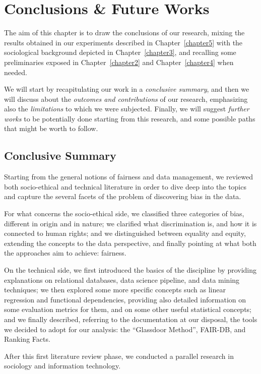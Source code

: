 \chapter{Conclusions \& Future Works}
\label{chapter6}
\thispagestyle{empty}

The aim of this chapter is to draw the conclusions of our research, mixing the results obtained in our experiments described in Chapter~\ref{chapter5} with the sociological background depicted in Chapter~\ref{chapter3}, and recalling some preliminaries exposed in Chapter~\ref{chapter2} and Chapter~\ref{chapter4} when needed.

We will start by recapitulating our work in a \textit{conclusive summary}, and then we will discuss about the \textit{outcomes and contributions} of our research, emphasizing also the \textit{limitations} to which we were subjected. Finally, we will suggest \textit{further works} to be potentially done starting from this research, and some possible paths that might be worth to follow.


\section{Conclusive Summary}
Starting from the general notions of fairness and data management, we reviewed both socio-ethical and technical literature in order to dive deep into the topics and capture the several facets of the problem of discovering bias in the data.

For what concerns the socio-ethical side, we classified three categories of bias, different in origin and in nature; we clarified what discrimination is, and how it is connected to human rights; and we distinguished between equality and equity, extending the concepts to the data perspective, and finally pointing at what both the approaches aim to achieve: fairness.

On the technical side, we first introduced the basics of the discipline by providing explanations on relational databases, data science pipeline, and data mining techniques; we then explored some more specific concepts such as linear regression and functional dependencies, providing also detailed information on some evaluation metrics for them, and on some other useful statistical concepts; and we finally described, referring to the documentation at our disposal, the tools we decided to adopt for our analysis: the ``Glassdoor Method'', FAIR-DB, and Ranking Facts.

After this first literature review phase, we conducted a parallel research in sociology and information technology.

